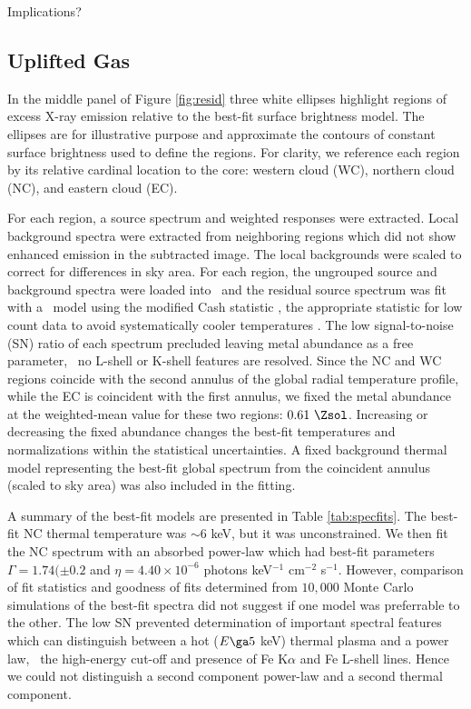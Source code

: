 \documentclass{emulateapj}
\begin{document}
Implications?

\subsection{Uplifted Gas}
\label{sec:uplift}

In the middle panel of Figure \ref{fig:resid} three white ellipses
highlight regions of excess X-ray emission relative to the best-fit
surface brightness model. The ellipses are for illustrative purpose
and approximate the contours of constant surface brightness used to
define the regions. For clarity, we reference each region by its
relative cardinal location to the core: western cloud (WC), northern
cloud (NC), and eastern cloud (EC).

For each region, a source spectrum and weighted responses were
extracted. Local background spectra were extracted from neighboring
regions which did not show enhanced emission in the subtracted
image. The local backgrounds were scaled to correct for differences in
sky area. For each region, the ungrouped source and background spectra
were loaded into \xspec\ and the residual source spectrum was fit with
a \mekal\ model using the modified Cash statistic
\citep{1979ApJ...228..939C}, the appropriate statistic for low count
data to avoid systematically cooler temperatures
\citep{1989ApJ...342.1207N, 2007A&A...462..429B}. The low
signal-to-noise (SN) ratio of each spectrum precluded leaving metal
abundance as a free parameter, \eg\ no L-shell or K-shell features are
resolved. Since the NC and WC regions coincide with the second annulus
of the global radial temperature profile, while the EC is coincident
with the first annulus, we fixed the metal abundance at the
weighted-mean value for these two regions: $0.61~\Zsol$. Increasing or
decreasing the fixed abundance changes the best-fit temperatures and
normalizations within the statistical uncertainties. A fixed
background thermal model representing the best-fit global spectrum
from the coincident annulus (scaled to sky area) was also included in
the fitting.

A summary of the best-fit models are presented in Table
\ref{tab:specfits}. The best-fit NC thermal temperature was $\sim 6$
keV, but it was unconstrained. We then fit the NC spectrum with an
absorbed power-law which had best-fit parameters $\Gamma = 1.74 (\pm
0.2$ and $\eta = 4.40\times10^{-6}$ photons keV$^{-1}$ cm$^{-2}$
s$^{-1}$. However, comparison of fit statistics and goodness of fits
determined from $10,000$ Monte Carlo simulations of the best-fit
spectra did not suggest if one model was preferrable to the other. The
low SN prevented determination of important spectral features which
can distinguish between a hot ($E \ga 5$ keV) thermal plasma and a
power law, \eg\ the high-energy cut-off and presence of Fe K$\alpha$
and Fe L-shell lines. Hence we could not distinguish a second
component power-law and a second thermal component.
\end{document}
